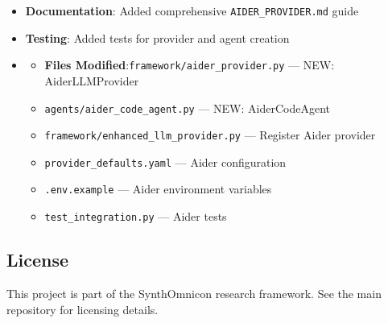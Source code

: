 \documentclass[12pt,a4paper]{article}
\begin{document}
\begin{itemize}
\begin{itemize}
    \item \textbf{Documentation}: Added comprehensive \texttt{AIDER\_PROVIDER.md} guide
    \item \textbf{Testing}: Added tests for provider and agent creation
    \item 
    \begin{itemize}
    \item \textbf{Files Modified}:\texttt{framework/aider\_provider.py} --- NEW: AiderLLMProvider
    \item \texttt{agents/aider\_code\_agent.py} --- NEW: AiderCodeAgent
    \item \texttt{framework/enhanced\_llm\_provider.py} --- Register Aider provider
    \item \texttt{provider\_defaults.yaml} --- Aider configuration
    \item \texttt{.env.example} --- Aider environment variables
    \item \texttt{test\_integration.py} --- Aider tests
\end{itemize}

\end{itemize}

\end{itemize}

\subsection{License}

This project is part of the SynthOmnicon research framework. See the main repository for licensing details.
\end{document}
